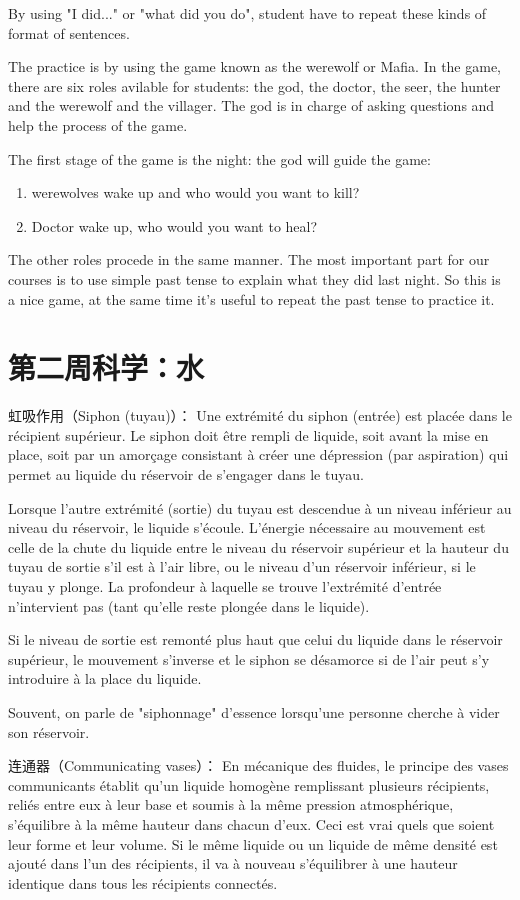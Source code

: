 \documentclass{article}
\theoremstyle{definition}
\theoremstyle{remark}
\theoremstyle{theorem}
\begin{document}
By using "I did..." or "what did you do", student have to repeat these kinds of format of sentences.

The practice is by using the game known as the werewolf or Mafia. In the game, there are six roles avilable for students: the god, the doctor, the seer, the hunter and the werewolf and the villager. The god is in charge of asking questions and help the process of the game. 

The first stage of the game is the night: the god will guide the game: 
\begin{enumerate}
    \item werewolves wake up and who would you want to kill?
    \item Doctor wake up, who would you want to heal?
\end{enumerate}
The other roles procede in the same manner. The most important part for our courses is to use simple past tense to explain what they did last night. So this is a nice game, at the same time it's useful to repeat the past tense to practice it. 
\section{第二周科学：水}
虹吸作用（Siphon (tuyau)）：
Une extrémité du siphon (entrée) est placée dans le récipient supérieur. Le siphon doit être rempli de liquide, soit avant la mise en place, soit par un amorçage consistant à créer une dépression (par aspiration) qui permet au liquide du réservoir de s'engager dans le tuyau.

Lorsque l'autre extrémité (sortie) du tuyau est descendue à un niveau inférieur au niveau du réservoir, le liquide s'écoule. L'énergie nécessaire au mouvement est celle de la chute du liquide entre le niveau du réservoir supérieur et la hauteur du tuyau de sortie s'il est à l'air libre, ou le niveau d'un réservoir inférieur, si le tuyau y plonge. La profondeur à laquelle se trouve l'extrémité d'entrée n'intervient pas (tant qu'elle reste plongée dans le liquide).

Si le niveau de sortie est remonté plus haut que celui du liquide dans le réservoir supérieur, le mouvement s'inverse et le siphon se désamorce si de l'air peut s'y introduire à la place du liquide.

Souvent, on parle de "siphonnage" d'essence lorsqu'une personne cherche à vider son réservoir.

连通器（Communicating vases）：
En mécanique des fluides, le principe des vases communicants établit qu'un liquide homogène remplissant plusieurs récipients, reliés entre eux à leur base et soumis à la même pression atmosphérique, s'équilibre à la même hauteur dans chacun d'eux. Ceci est vrai quels que soient leur forme et leur volume. Si le même liquide ou un liquide de même densité est ajouté dans l'un des récipients, il va à nouveau s'équilibrer à une hauteur identique dans tous les récipients connectés.
\end{document}
